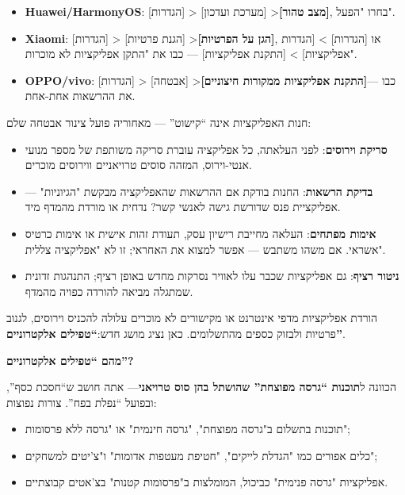 \begin{itemize}
  \item \textbf{Huawei/HarmonyOS}: [הגדרות] > [מערכת ועדכון] >\textbf{[מצב טהור]}, בחרו "הפעל".
  \item \textbf{Xiaomi}: [הגדרות] > [הגנת פרטיות] >\textbf{[הגן על הפרטיות]}, או [הגדרות] > [הגדרות אפליקציות] > [התקנת אפליקציות] — כבו את "התקן אפליקציות לא מוכרות".
  \item \textbf{OPPO/vivo}: [הגדרות] > [אבטחה] >\textbf{[התקנת אפליקציות ממקורות חיצוניים]}— כבו את ההרשאות אחת-אחת.
\end{itemize}


חנות האפליקציות אינה “קישוט” — מאחוריה פועל צינור אבטחה שלם:

\begin{itemize}
  \item \textbf{סריקת וירוסים}: לפני העלאתה, כל אפליקציה עוברת סריקה משותפת של מספר מנועי אנטי-וירוס, המזהה סוסים טרויאניים ווירוסים מוכרים.
  \item \textbf{בדיקת הרשאות}: החנות בודקת אם ההרשאות שהאפליקציה מבקשת "הגיוניות" — אפליקציית פנס שדורשת גישה לאנשי קשר? נדחית או מורדת מהמדף מיד.
  \item \textbf{אימות מפתחים}: העלאה מחייבת רישיון עסק, תעודת זהות אישית או אימות כרטיס אשראי. אם משהו משתבש — אפשר למצוא את האחראי; זו לא "אפליקציה צללית".
  \item \textbf{ניטור רציף}: גם אפליקציות שכבר עלו לאוויר נסרקות מחדש באופן רציף; התנהגות זדונית שמתגלה מביאה להורדה כפויה מהמדף.
\end{itemize}


הורדת אפליקציות מדפי אינטרנט או מקישורים לא מוכרים עלולה להכניס וירוסים, לגנוב פרטיות ולבזוק כספים מהתשלומים. כאן נציג מושג חדש:\textbf{“טפילים אלקטרוניים”}.

\textbf{מהם “טפילים אלקטרוניים”?}\par

הכוונה ל\textbf{תוכנות “גרסה מפוצחת” שהושתל בהן סוס טרויאני}— אתה חושב ש“חסכת כסף”, ובפועל “נפלת בפח”. צורות נפוצות:

\begin{itemize}
  \item תוכנות בתשלום ב"גרסה מפוצחת", "גרסה חינמית" או "גרסה ללא פרסומות";
  \item כלים אפורים כמו "הגדלת לייקים", "חטיפת מעטפות אדומות" ו"צ'יטים למשחקים";
  \item אפליקציות "גרסה פנימית" כביכול, המומלצות ב"פרסומות קטנות" בצ'אטים קבוצתיים.
\end{itemize}

